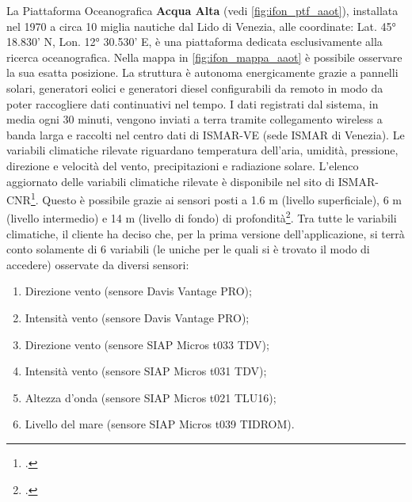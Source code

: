 \documentclass[./main.tex]{subfiles}
\begin{document}
\begin{figure}[!ht]
\begin{minipage}{0.4\textwidth}
\captionsetup{font=small, hypcap=false}
\label{fig:ifon_ptf_aaot}
\end{minipage}
\vspace{0.25cm}
\end{figure}

La Piattaforma Oceanografica \textbf{Acqua Alta} (vedi \autoref{fig:ifon_ptf_aaot}), installata nel 1970 a circa 10 miglia nautiche dal Lido di Venezia, alle coordinate: Lat. 45° 18.830' N, Lon. 12° 30.530' E, è una piattaforma dedicata esclusivamente alla ricerca oceanografica. Nella mappa in \autoref{fig:ifon_mappa_aaot} è possibile osservare la sua esatta posizione. La struttura è autonoma energicamente grazie a pannelli solari, generatori eolici e generatori diesel configurabili da remoto in modo da poter raccogliere dati continuativi nel tempo. I dati registrati dal sistema, in media ogni 30 minuti, vengono inviati a terra tramite collegamento wireless a banda larga e raccolti nel centro dati di ISMAR-VE (sede ISMAR di Venezia). Le variabili climatiche rilevate riguardano temperatura dell'aria, umidità, pressione, direzione e velocità del vento, precipitazioni e radiazione solare. L'elenco aggiornato delle variabili climatiche rilevate è disponibile nel sito di ISMAR-CNR\footcite[\url{https://www.ismar.cnr.it/infrastrutture/infrastrutture-oceanografiche/piattaforma-acqua-alta/}]{website-ismar-cnr}. Questo è possibile grazie ai sensori posti a 1.6 m (livello superficiale), 6 m (livello intermedio) e 14 m (livello di
fondo) di profondità\footcite[12-13]{rete-ifon}. Tra tutte le variabili climatiche, il cliente ha deciso che, per la prima versione dell'applicazione, si terrà conto solamente di 6 variabili (le uniche per le quali si è trovato il modo di accedere) osservate da diversi sensori:
\begin{enumerate}
    \item Direzione vento (sensore Davis Vantage PRO);
    \item Intensità vento (sensore Davis Vantage PRO);
    \item Direzione vento (sensore SIAP Micros t033 TDV);
    \item Intensità vento (sensore SIAP Micros t031 TDV);
    \item Altezza d'onda (sensore SIAP Micros t021 TLU16);
    \item Livello del mare (sensore SIAP Micros t039 TIDROM).
\end{enumerate}
\end{document}
